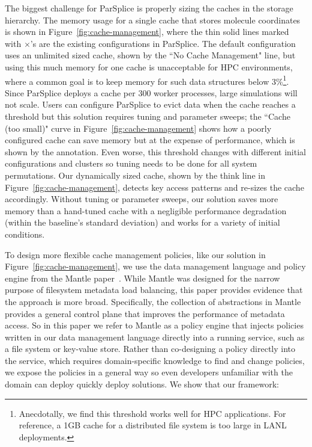 The biggest challenge for ParSplice is properly sizing the caches in the
storage hierarchy.  The memory usage for a single cache that stores molecule
coordinates is shown in Figure~\ref{fig:cache-management}, where the thin solid
lines marked with \(\times\)'s are the existing configurations in ParSplice.
The default configuration uses an unlimited sized cache, shown by the ``No
Cache Management" line, but using this much memory for one cache is
unacceptable for HPC environments, where a common goal is to keep memory for
such data structures below 3\%\footnote{Anecdotally, we find this threshold
works well for HPC applications.  For reference, a 1GB cache for a distributed
file system is too large in LANL deployments.}. Since ParSplice deploys a cache
per 300 worker processes, large simulations will not scale.  Users can
configure ParSplice to evict data when the cache reaches a threshold but this
solution requires tuning and parameter sweeps; the ``Cache (too small)" curve
in Figure~\ref{fig:cache-management} shows how a poorly configured cache can
save memory but at the expense of performance, which is shown by the
annotation.  Even worse, this threshold changes with different initial
configurations and clusters so tuning needs to be done for all system
permutations.  Our dynamically sized cache, shown by the think line in
Figure~\ref{fig:cache-management}, detects key access patterns and re-sizes the
cache accordingly.  Without tuning or parameter sweeps, our solution saves more
memory than a hand-tuned cache with a negligible performance degradation
(within the baseline's standard deviation) and works for a variety of initial
conditions.

To design more flexible cache management policies, like our solution in
Figure~\ref{fig:cache-management}, we use the data management language and
policy engine from the Mantle paper~\cite{sevilla:sc15-mantle}.  While Mantle
was designed for the narrow purpose of filesystem metadata load balancing, this
paper provides evidence that the approach is more broad.  Specifically, the
collection of abstractions in Mantle provides a general control plane that
improves the performance of metadata access. So in this paper we refer to
Mantle as a policy engine that injects policies written in our data management
language directly into a running service, such as a file system or key-value
store.  Rather than co-designing a policy directly into the service, which
requires domain-specific knowledge to find and change policies, we expose the
policies in a general way so even developers unfamiliar with the domain can
deploy quickly deploy solutions.  We show that our framework:

